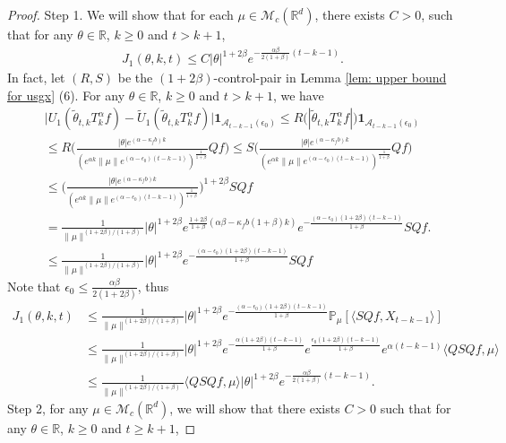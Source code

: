 \documentclass[12pt,oneside,english]{amsart}
\theoremstyle{plain}
\theoremstyle{definition}
\numberwithin{equation}{section}
\begin{document}
\begin{proof}
Step 1.  We will show that for each $\mu \in\mathcal{M}_c(\mathbb{R}^d)$, there exists $C>0$, such that for any $\theta\in \mathbb{R}$, $k\geq 0$ and $t>k+1$,
    \begin{align}
    \label{lemma31q}
      J_1(\theta,k,t)\leq C|\theta|^{1+2\beta}e^{-\frac{\alpha\beta}{2(1+\beta)}(t-k-1)}.
    \end{align}
In fact, let $(R,S)$ be the $(1+2\beta)$-control-pair in Lemma \ref{lem: upper bound for usgx} (6). For any $\theta\in\mathbb{R}$, $k \geq 0$ and $t>k+1$, we have
\begin{align}
   & \big|U_1(\tilde{\theta}_{t,k}T_k^{\alpha}f)-\tilde{U}_1(\tilde{\theta}_{t,k}T_k^{\alpha}f)\big|\mathbf{1}_{\mathcal{A}_{t-k-1}(\epsilon_0)}
   \leq R\big(|\tilde{\theta}_{t,k}T_k^{\alpha}f|\big)\mathbf{1}_{\mathcal{A}_{t-k-1}(\epsilon_0)}
   \\&\leq R \Big(\frac{|\theta|e^{(\alpha-\kappa_fb)k}}{(e^{\alpha k}\|\mu\|e^{(\alpha-\epsilon_0)(t-k-1)})^\frac{1}{1+\beta}}Qf\Big)
    \leq S \Big(\frac{|\theta|e^{(\alpha-\kappa_fb)k}}{(e^{\alpha k}\|\mu\|e^{(\alpha-\epsilon_0)(t-k-1)})^\frac{1}{1+\beta}}Qf\Big)
   \\&\leq \Big(\frac{|\theta|e^{(\alpha-\kappa_fb)k}}{(e^{\alpha k}\|\mu\|e^{(\alpha-\epsilon_0)(t-k-1)})^\frac{1}{1+\beta}}\Big)^{1+2\beta}SQf
   \\&=\frac{1}{\|\mu\|^{(1+2\beta)/(1+\beta)}}|\theta|^{1+2\beta}e^{\frac{1+2\beta}{1+\beta}(\alpha\beta-\kappa_fb(1+\beta)k)}e^{-\frac{(\alpha-\epsilon_0)(1+2\beta)(t-k-1)}{1+\beta}}SQf.
   \\&\leq \frac{1}{\|\mu\|^{(1+2\beta)/(1+\beta)}}|\theta|^{1+2\beta}e^{-\frac{(\alpha-\epsilon_0)(1+2\beta)(t-k-1)}{1+\beta}}SQf
\end{align}
Note that $\epsilon_0\leq \frac{\alpha\beta}{2(1+2\beta)}$, thus
\begin{align}
     J_1(\theta,k,t)&
     \leq \frac{1}{\|\mu\|^{(1+2\beta)/(1+\beta)}}|\theta|^{1+2\beta}e^{-\frac{(\alpha-\epsilon_0)(1+2\beta)(t-k-1)}{1+\beta}}\mathbb{P}_{\mu}[\langle SQf,X_{t-k-1}\rangle]\\
     & \leq \frac{1}{\|\mu\|^{(1+2\beta)/(1+\beta)}}|\theta|^{1+2\beta}e^{-\frac{\alpha(1+2\beta)(t-k-1)}{1+\beta}}e^{\frac{\epsilon_0(1+2\beta)(t-k-1)}{1+\beta}}e^{\alpha(t-k-1)}\langle QSQf, \mu \rangle\\
     & \leq \frac{1}{\|\mu\|^{(1+2\beta)/(1+\beta)}}\langle QSQf,\mu\rangle|\theta|^{1+2\beta}e^{-\frac{\alpha\beta}{2(1+\beta)}(t-k-1)}.
\end{align}
Step 2, for any $\mu \in \mathcal{M}_c(\mathbb{R}^d)$, we will show that there exists $C>0$ such that for any $\theta\in \mathbb{R}$, $k\geq 0$ and $t\geq k+1$, 

\end{proof}
\end{document}
